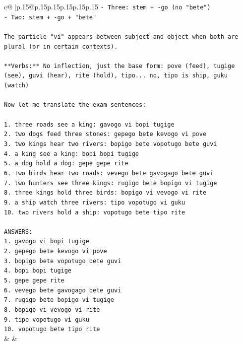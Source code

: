 \documentclass{article}
\begin{document}
{\begin{supertabular}{c@{$\;$}|p{.15\linewidth}@{}p{.15\linewidth}p{.15\linewidth}p{.15\linewidth}p{.15\linewidth}p{.15\linewidth}}
{{{\texttt{{-} Three: stem + {-}go (no "bete")} \\
\texttt{{-} Two: stem + {-}go + "bete"} \\
\\ 
\texttt{The particle "vi" appears between subject and object when both are plural (or in certain contexts).} \\
\\ 
\texttt{**Verbs:** No inflection, just the base form: pove (feed), tugige (see), guvi (hear), rite (hold), tipo... no, tipo is ship, guku (watch)} \\
\\ 
\texttt{Now let me translate the exam sentences:} \\
\\ 
\texttt{1. three roads see a king: gavogo vi bopi tugige} \\
\texttt{2. two dogs feed three stones: gepego bete kevogo vi pove} \\
\texttt{3. two kings hear two rivers: bopigo bete vopotugo bete guvi} \\
\texttt{4. a king see a king: bopi bopi tugige} \\
\texttt{5. a dog hold a dog: gepe gepe rite} \\
\texttt{6. two birds hear two roads: vevego bete gavogago bete guvi} \\
\texttt{7. two hunters see three kings: rugigo bete bopigo vi tugige} \\
\texttt{8. three kings hold three birds: bopigo vi vevogo vi rite} \\
\texttt{9. a ship watch three rivers: tipo vopotugo vi guku} \\
\texttt{10. two rivers hold a ship: vopotugo bete tipo rite} \\
\\ 
\texttt{ANSWERS:} \\
\texttt{1. gavogo vi bopi tugige} \\
\texttt{2. gepego bete kevogo vi pove} \\
\texttt{3. bopigo bete vopotugo bete guvi} \\
\texttt{4. bopi bopi tugige} \\
\texttt{5. gepe gepe rite} \\
\texttt{6. vevego bete gavogago bete guvi} \\
\texttt{7. rugigo bete bopigo vi tugige} \\
\texttt{8. bopigo vi vevogo vi rite} \\
\texttt{9. tipo vopotugo vi guku} \\
\texttt{10. vopotugo bete tipo rite} \\
            }
        }
    }
    & & \\ \\


\end{supertabular}}
\end{document}
